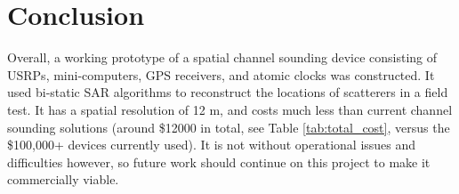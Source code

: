 \chapter{Conclusion}
Overall, a working prototype of a spatial channel sounding device consisting of USRPs, mini-computers, GPS receivers, and atomic clocks was constructed. It used bi-static SAR algorithms to reconstruct the locations of scatterers in a field test. It has a spatial resolution of 12 m, and costs much less than current channel sounding solutions (around \$12000 in total, see Table \ref{tab:total_cost}, versus the \$100,000+ devices currently used). It is not without operational issues and difficulties however, so future work should continue on this project to make it commercially viable.
